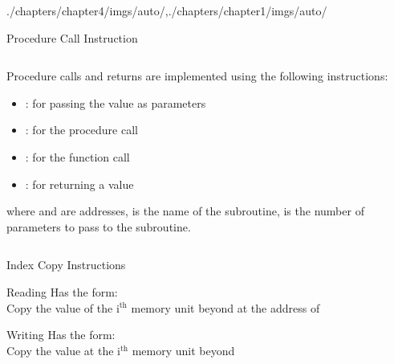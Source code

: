 \begin{graphicspathcontext}{{./chapters/chapter4/imgs/auto/},{./chapters/chapter1/imgs/auto/}}
\begin{bibunit}[apalike]
\begin{frame}[background=9]{Procedure Call Instruction}
	\begin{columns}
		\begin{column}{.8\linewidth}
		\begin{small}
		Procedure calls and returns are implemented using the following instructions:
		\vfill
		\begin{itemize}
		\item {}: for passing the value  as parameters
		\vfill
		\item {}: for the procedure call
		\vfill
		\item {}: for the function call
		\vfill
		\item {}: for returning a value
		\end{itemize}
		\vfill
		where  and  are addresses,  is the name of the subroutine,  is the number of parameters to pass to the subroutine.
		\end{small}
		\end{column}
		\begin{column}{.2\linewidth}
			\begin{tac}[\linewidth]
				\tacdots
			\end{tac}
		\end{column}
	\end{columns}
	\vfill
\end{frame}

\begin{frame}{{Index Copy} Instructions}
	\begin{definitionblock}{Reading}
		Has the form: \emph{} \\
		Copy the value of the i$^{\text{th}}$ memory unit beyond  at the address of 
	\end{definitionblock}
	\vspace{1cm}
	\begin{definitionblock}{Writing}
	Has the form: \emph{} \\
	Copy the value  at the i$^{\text{th}}$ memory unit beyond 
	\end{definitionblock}
\end{frame}


\end{bibunit}
\end{graphicspathcontext}
